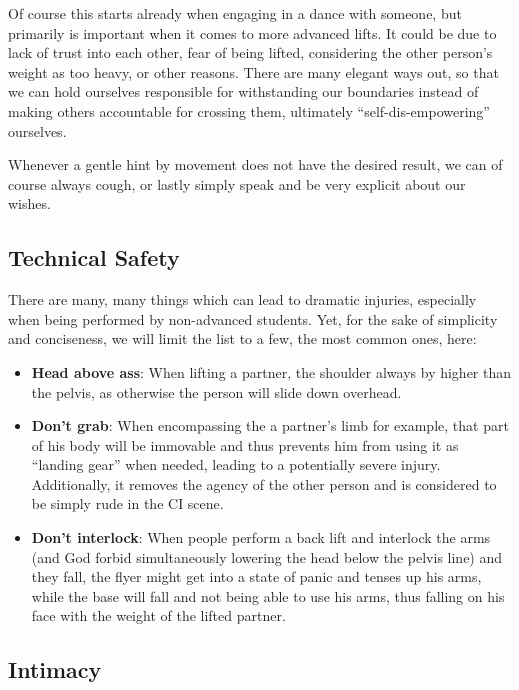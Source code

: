 Of course this starts already when engaging in a dance with someone, but primarily is important when it comes to more advanced lifts.
It could be due to lack of trust into each other, fear of being lifted, considering the other person's weight as too heavy, or other reasons.
There are many elegant ways out, so that we can hold ourselves responsible for withstanding our boundaries instead of making others accountable for crossing them, ultimately ``self-dis-empowering'' ourselves.

Whenever a gentle hint by movement does not have the desired result, we can of course always cough, or lastly simply speak and be very explicit about our wishes.

\subsection{Technical Safety}\label{subsec:technical-safety}

There are many, many things which can lead to dramatic injuries, especially when being performed by non-advanced students.
Yet, for the sake of simplicity and conciseness, we will limit the list to a few, the most common ones, here:

\begin{itemize}
    \item \textbf{Head above ass}: When lifting a partner, the shoulder always by higher than the pelvis, as otherwise the person will slide down overhead.
    \item \textbf{Don't grab}: When encompassing the a partner's limb for example, that part of his body will be immovable and thus prevents him from using it as ``landing gear'' when needed, leading to a potentially severe injury.
    Additionally, it removes the agency of the other person and is considered to be simply rude in the CI scene.
    \item \textbf{Don't interlock}: When people perform a back lift and interlock the arms (and God forbid simultaneously lowering the head below the pelvis line) and they fall, the flyer might get into a state of panic and tenses up his arms, while the base will fall and not being able to use his arms, thus falling on his face with the weight of the lifted partner.
\end{itemize}

\subsection{Intimacy}\label{subsec:intimacy}

